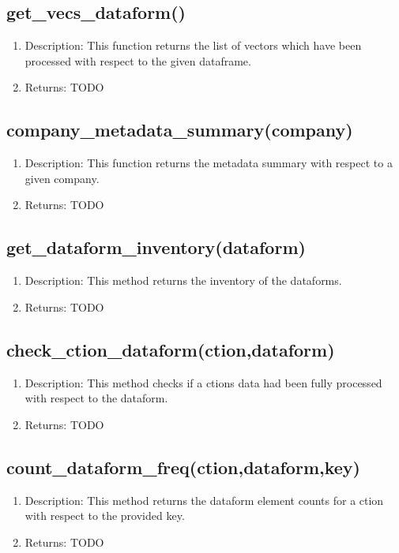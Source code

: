 \documentclass{article}
\begin{document}
\subsection{get_vecs_dataform()}
\begin{enumerate}
\item Description: This function returns the list of vectors which have been processed with respect to the given dataframe.
\item Returns: 
TODO
\end{enumerate}




\subsection{company_metadata_summary(company)}
\begin{enumerate}
\item Description: This function returns the metadata summary with respect to a given company.
\item Returns: 
TODO
\end{enumerate}


\subsection{get_dataform_inventory(dataform)}
\begin{enumerate}
\item Description: This method returns the inventory of the dataforms. 
\item Returns: 
TODO
\end{enumerate}





\subsection{check_ction_dataform(ction,dataform)}
\begin{enumerate}
\item Description: This method checks if a ctions data had been fully processed with respect to the dataform.
\item Returns: 
TODO
\end{enumerate}


\subsection{count_dataform_freq(ction,dataform,key)}
\begin{enumerate}
\item Description: This method returns the dataform element counts for a ction with respect to the provided key.
\item Returns: 
TODO
\end{enumerate}
\end{document}
